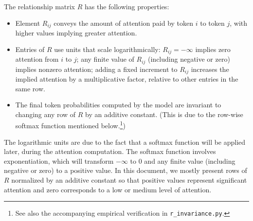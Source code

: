 \documentclass{article}
\begin{document}
The relationship matrix $R$ has the following properties:
\begin{itemize}
\item Element $R_{ij}$ conveys the amount of attention paid by token $i$ to token $j$, with higher values implying greater attention.
\item Entries of $R$ use units that scale logarithmically:
  $R_{ij}=-\infty$ implies zero attention from $i$ to $j$; any finite
  value of $R_{ij}$ (including negative or zero) implies nonzero
  attention; adding a fixed increment to $R_{ij}$ increases the
  implied attention by a multiplicative factor, relative to other entries in the same row. 
\item The final token probabilities computed by the model are invariant to changing any row of $R$ by an additive constant. (This is due to the row-wise softmax function mentioned below.\footnote{See also the accompanying empirical verification in \texttt{r\_invariance.py}.})
\end{itemize}
The logarithmic units are due to the fact that a softmax function will
be applied later, during the attention computation. The softmax
function involves exponentiation, which will transform $-\infty$ to 0
and any finite value (including negative or zero) to a positive
value. In this document, we mostly present rows of $R$ normalized by an additive constant so that positive values represent significant attention and zero corresponds to a low or medium level of attention.
\end{document}
